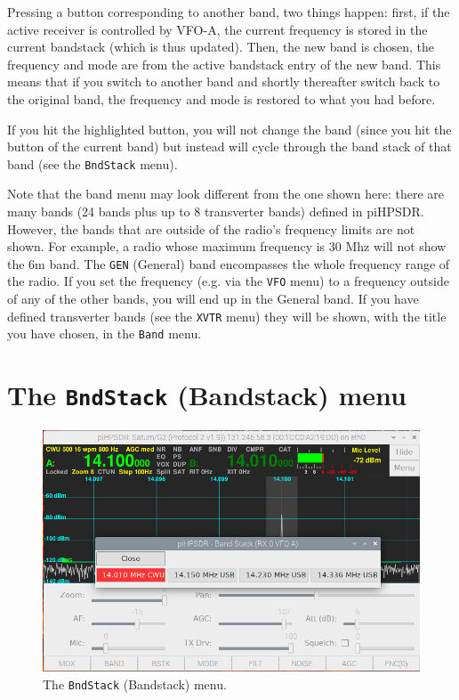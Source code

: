 \documentclass[12pt]{book}
\def\rett#1{\texttt{\color{red}#1}}
\def\bltt#1{\texttt{\color{blue}#1}}
\begin{document}
Pressing a button corresponding to another band, two things happen: first, if the 
active receiver is controlled by VFO-A, the current frequency is stored in the current
bandstack (which is thus updated). Then, the new band is chosen, the frequency and mode
are from the active bandstack entry of the new band. This means that if you switch
to another band and shortly thereafter switch back to the original band, the
frequency and mode is restored to what you had before.

If you hit the highlighted button, you will not change the band (since you hit the
button of the current band) but instead will cycle through the band stack of that band
(see the \bltt{BndStack} menu).


Note that the band menu may look different from the one shown here: there are many bands
(24 bands plus up to 8 transverter bands) defined in piHPSDR. However, the bands that
are outside of the radio's frequency limits are not shown. For example, a radio
whose maximum frequency is 30 Mhz will not show the 6m band. The \rett{GEN} (General)
band encompasses the whole frequency range of the radio. If you set the frequency
(e.g. via the \bltt{VFO} menu) to a frequency outside of any of the other bands, you
will end up in the General band. If you have defined transverter bands (see the
\bltt{XVTR} menu) they will be shown, with the title you have chosen, in the
\bltt{Band} menu.

\section{The  \texttt{BndStack} (Bandstack) menu}

\begin{figure}[ht!]
\center
\includegraphics[width=12cm]{BandstackMenu.png}
\caption{The \bltt{BndStack} (Bandstack) menu.}
\label{fig:BandstackMenu}
\end{figure}
\end{document}
